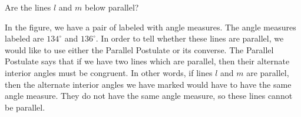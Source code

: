 \documentclass{ximera}
\begin{document}
\begin{question}
Are the lines $l$ and $m$ below parallel?
\begin{image}
\end{image}

\begin{multipleChoice}
\end{multipleChoice}

\begin{explanation}
In the figure, we have a pair of  labeled with angle measures. The angle measures labeled are $134^{\circ}$ and $136^{\circ}$. In order to tell whether these lines are parallel, we would like to use either the Parallel Postulate or its converse. The Parallel Postulate says that if we have two lines which are parallel, then their alternate interior angles must be congruent. In other words, if lines $l$ and $m$ are parallel, then the alternate interior angles we have marked would have to have the same angle measure. They do not have the same angle measure, so these lines cannot be parallel.
\end{explanation}


\end{question}
\end{document}
